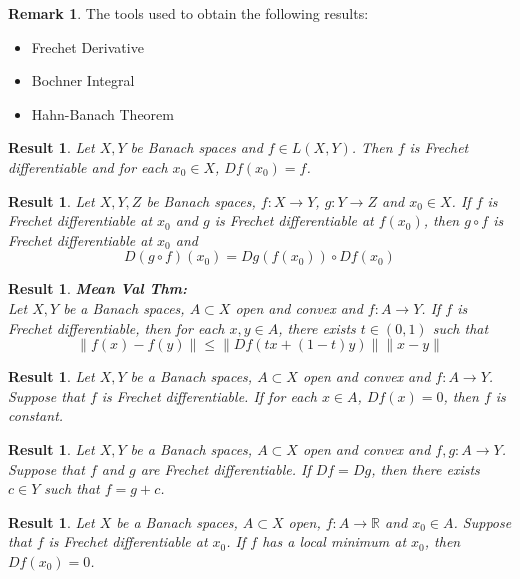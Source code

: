 \documentclass[twoside]{article}
\newtheorem{res}[thm]{Result}
\theoremstyle{definition}
\theoremstyle{definition}
\newtheorem{rem}[definition]{Remark}
\newcommand{\R}{\mathbb{R}}
\begin{document}
\begin{rem}
The tools used to obtain the following results: 

\begin{itemize}
\item Frechet Derivative

\item Bochner Integral

\item Hahn-Banach Theorem  
\end{itemize}
\end{rem}

\begin{res}
Let $X,Y$ be Banach spaces and $f \in L(X,Y)$. Then $f$ is Frechet differentiable and for each $x_0 \in X$, $Df(x_0) = f$. 
\end{res}


\begin{res}
Let $X,Y, Z$ be Banach spaces, $f:X \rightarrow Y$, $g :Y \rightarrow Z$ and $x_0 \in X$. If $f$ is Frechet differentiable at $x_0$ and $g$ is Frechet differentiable at $f(x_0)$, then $g \circ f$ is Frechet differentiable at $x_0$ and $$D(g \circ f)(x_0) = Dg(f(x_0)) \circ Df(x_0)$$
\end{res}


\begin{res}\textbf{Mean Val Thm:}\\
Let $X, Y$ be a Banach spaces, $A \subset X$ open and convex and $f:A \rightarrow Y$. If $f$ is Frechet differentiable, then for each $x,y \in A$, there exists $t \in (0,1)$ such that $$\|f(x) - f(y)\| \leq \|Df(tx + (1-t)y)\|\|x-y\|$$
\end{res}


\begin{res}
Let $X, Y$ be a Banach spaces, $A \subset X$ open and convex and $f:A \rightarrow Y$. Suppose that $f$ is Frechet differentiable. If for each $x \in A$, $Df(x) = 0$, then $f$ is constant.
\end{res}

\begin{res}
Let $X, Y$ be a Banach spaces, $A \subset X$ open and convex and $f,g:A \rightarrow Y$. Suppose that $f$ and $g$ are Frechet differentiable. If $Df = Dg$, then there exists $c \in Y$ such that $f = g+c$.
\end{res}

\begin{res}
Let $X$ be a Banach spaces, $A \subset X$ open, $f:A \rightarrow \R$ and $x_0 \in A$. Suppose that $f$ is Frechet differentiable at $x_0$. If $f$ has a local minimum at $x_0$, then $Df(x_0) = 0$. 
\end{res}
	
\end{document}
